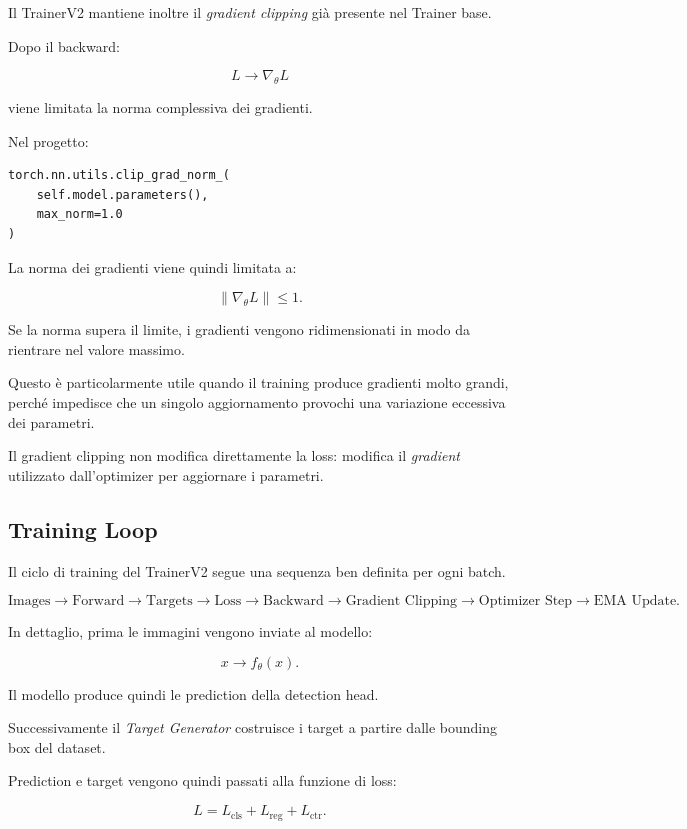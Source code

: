 Il TrainerV2 mantiene inoltre il \textit{gradient clipping} già presente nel
Trainer base.

Dopo il backward:

\[
L
\rightarrow
\nabla_\theta L
\]

viene limitata la norma complessiva dei gradienti.

Nel progetto:

\begin{verbatim}
torch.nn.utils.clip_grad_norm_(
    self.model.parameters(),
    max_norm=1.0
)
\end{verbatim}

La norma dei gradienti viene quindi limitata a:

\[
\|\nabla_\theta L\|\leq1.
\]

Se la norma supera il limite, i gradienti vengono ridimensionati in modo da
rientrare nel valore massimo.

Questo è particolarmente utile quando il training produce gradienti molto
grandi, perché impedisce che un singolo aggiornamento provochi una variazione
eccessiva dei parametri.

Il gradient clipping non modifica direttamente la loss: modifica il
\textit{gradient} utilizzato dall'optimizer per aggiornare i parametri.

\subsection{Training Loop}

Il ciclo di training del TrainerV2 segue una sequenza ben definita per ogni
batch.

\[
\text{Images}
\rightarrow
\text{Forward}
\rightarrow
\text{Targets}
\rightarrow
\text{Loss}
\rightarrow
\text{Backward}
\rightarrow
\text{Gradient Clipping}
\rightarrow
\text{Optimizer Step}
\rightarrow
\text{EMA Update}.
\]

In dettaglio, prima le immagini vengono inviate al modello:

\[
x
\rightarrow
f_\theta(x).
\]

Il modello produce quindi le prediction della detection head.

Successivamente il \textit{Target Generator} costruisce i target a partire
dalle bounding box del dataset.

Prediction e target vengono quindi passati alla funzione di loss:

\[
L=
L_{\text{cls}}
+
L_{\text{reg}}
+
L_{\text{ctr}}.
\]

